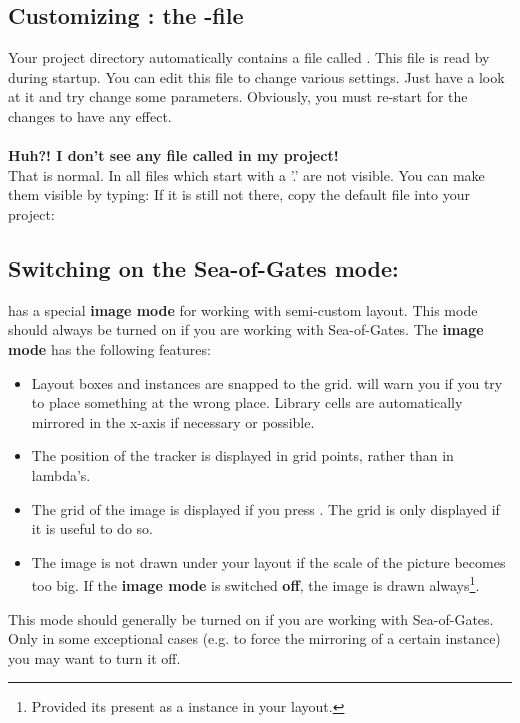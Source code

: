 \subsection{Customizing \protect{}: the \protect{}-file}
\label{dalirc}
Your project directory automatically contains a file called
.  This file is read by  during startup.
You can edit this file to change various settings. Just have a look at
it and try change some parameters. Obviously, you must re-start
 for the changes to have any effect.\\
\\
{\bf Huh?! I don't see any file called  in my project!}\\
That is normal. In  all files which start with a '.' are not
visible. You can make them visible by typing:
If it is still not there, copy the default file into your project:

\subsection{Switching on the Sea-of-Gates mode: \protect{}}
\label{sogmode}
 has a special {\bf image mode} for working with semi-custom
layout. This mode should always be turned on if you are working with
Sea-of-Gates. The {\bf image mode} has the following features:
\begin{itemize}
\item
Layout boxes and instances are snapped to the grid.  will
warn you if you try to place something at the wrong place. Library
cells are automatically mirrored in the x-axis if necessary or possible. 
\item
The position of the tracker is displayed in grid points, rather than in
lambda's. 
\item 
The grid of the image is displayed if you press .
The grid is only displayed if it is useful to do so.
\item 
The image is not drawn under your layout if the scale of the picture becomes
too big. If the {\bf image mode} is switched {\bf off}, the image is drawn
always\footnote{Provided its present as a instance in your layout.}.
\end{itemize}
This mode should generally be turned on if you are working with
Sea-of-Gates. Only in some exceptional cases (e.g. to force the
mirroring of a certain instance) you may want to turn it off.

